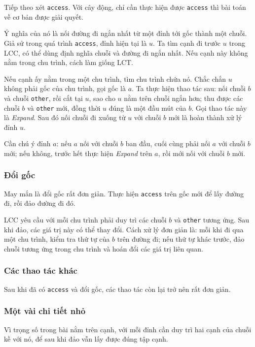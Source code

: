 \documentclass[11pt]{article}
\begin{document}
Tiếp theo xét \texttt{access}. Với cây động, chỉ cần thực hiện được
\texttt{access} thì bài toán về cơ bản được giải quyết.

Ý nghĩa của nó là nối đường đi ngắn nhất từ một đỉnh tới gốc thành một chuỗi.
Giả sử trong quá trình \texttt{access}, đỉnh hiện tại là \(u\). Ta tìm cạnh đi
trước \(u\) trong LCC, có thể dùng định nghĩa chuỗi và đường đi ngắn nhất. Nếu
cạnh này không nằm trong chu trình, cách làm giống LCT.

Nếu cạnh ấy nằm trong một chu trình, tìm chu trình chứa nó. Chắc chắn \(u\) không
phải gốc của chu trình, gọi gốc là \(a\). Ta thực hiện thao tác sau: nối chuỗi
\(b\) và chuỗi \texttt{other}, rồi cắt tại \(u\), sao cho \(u\) nằm trên chuỗi
ngắn hơn; thu được các chuỗi \(b\) và \texttt{other} mới, đồng thời \(u\) đúng là
một đầu mút của \(b\). Gọi thao tác này là \emph{Expand}. Sau đó nối chuỗi đi
xuống từ \(u\) với chuỗi \(b\) mới là hoàn thành xử lý đỉnh \(u\).

Cần chú ý đỉnh \(a\): nếu \(a\) nối với chuỗi \(b\) ban đầu, cuối cùng phải nối
\(a\) với chuỗi \(b\) mới; nếu không, trước hết thực hiện \emph{Expand} trên
\(a\), rồi mới nối với chuỗi \(b\) mới.

\subsubsection{Đổi gốc}

May mắn là đổi gốc rất đơn giản. Thực hiện \texttt{access} trên gốc mới để lấy
đường đi, rồi đảo đường đi đó.

LCC yêu cầu với mỗi chu trình phải duy trì các chuỗi \(b\) và \texttt{other}
tương ứng. Sau khi đảo, các giá trị này có thể thay đổi. Cách xử lý đơn giản là:
mỗi khi đi qua một chu trình, kiểm tra thứ tự của \(b\) trên đường đi; nếu thứ
tự khác trước, đảo chuỗi tương ứng trong chu trình và hoán đổi các giá trị liên
quan.

\subsubsection{Các thao tác khác}

Sau khi đã có \texttt{access} và đổi gốc, các thao tác còn lại trở nên rất đơn
giản.

\subsubsection{Một vài chi tiết nhỏ}

Vì trọng số trong bài nằm trên cạnh, với mỗi đỉnh cần duy trì hai cạnh của chuỗi
kề với nó, để sau khi đảo vẫn lấy được đúng tập cạnh.
\end{document}
